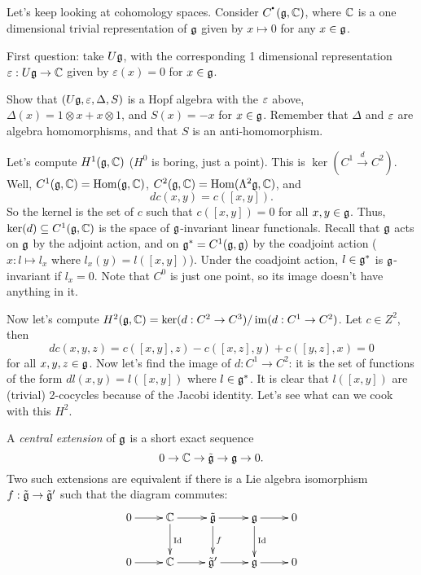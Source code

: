  Let's keep looking at cohomology spaces. Consider $C^{\udot}(\g,\CC)$, where $\mathbb{C}$ is
 a one dimensional trivial representation of $\mathfrak{g}$ given by $x\mapsto 0$ for any
 $x\in\mathfrak{g}$.

 First question: take $U\mathfrak{g}$, with the corresponding 1 dimensional representation
 $\varepsilon:U\mathfrak{g}\rightarrow\mathbb{C}$ given by $\varepsilon(x)=0$ for $x\in\mathfrak{g}$.

 \begin{exercise}
   Show that $(U\mathfrak{g},\varepsilon,\Delta,S)$ is a Hopf algebra with the $\varepsilon$ above,
   $\Delta(x)=1\otimes x+x\otimes 1$, and $S(x)=-x$  for $x\in\mathfrak{g}$. Remember that
   $\Delta$ and $\varepsilon$ are algebra homomorphisms, and that $S$ is an anti-homomorphism.
 \end{exercise}

 Let's compute $H^{1}(\mathfrak{g},\mathbb{C})$ ($H^{0}$ is boring, just a point). This is
 $\ker(C^{1}\xrightarrow{d} C^{2})$. Well, $C^{1}(\mathfrak{g},\mathbb{C})=\operatorname{Hom}(\mathfrak{g},\mathbb{C})$,
 $C^{2}(\mathfrak{g},\mathbb{C})=\operatorname{Hom} (\Lambda^{2}\mathfrak{g},\mathbb{C})$, and
 \[
 dc(x,y) = c([x,y]).
 \]
 So the kernel is the set of $c$ such that $c([x,y])=0$ for all $x,y\in\mathfrak{g}$. Thus,
 $\ker(d)\subseteq C^{1}(\mathfrak{g},\mathbb{C})$ is the space of $\mathfrak{g}$-invariant linear functionals. Recall
 that $\mathfrak{g}$ acts on $\mathfrak{g}$ by the adjoint action, and on
 $\mathfrak{g}^{*}=C^{1}(\mathfrak{g},\mathfrak{g})$ by the coadjoint action ($x:l\mapsto l_{x}$ where $l_{x}%
 (y)=l([x,y])$). Under the coadjoint action, $l\in \mathfrak{g}^*$ is $\mathfrak{g}$-invariant if
 $l_{x}=0$. Note that $C^{0}$ is just one point, so its image doesn't have anything in
 it.

 Now let's compute $H^{2}(\g,\CC)=\ker(d:C^{2}\rightarrow C^{3})/\im(d:C^{1}%
 \rightarrow C^{2})$. Let $c\in Z^{2}$, then
 \[
 dc(x,y,z)=c([x,y],z)-c([x,z],y)+c([y,z],x)=0
 \]
 for all $x,y,z\in\mathfrak{g}$. Now let's find the image of $d:C^{1}\rightarrow C^{2}$: it is
 the set of functions of the form $dl(x,y)=l([x,y])$ where $l\in\mathfrak{g}^{\ast }$. It is
 clear that $l([x,y])$ are (trivial) 2-cocycles because of the Jacobi identity. Let's
 see what can we cook with this $H^{2}$.

 \begin{definition}
 A \emph{central extension} of $\mathfrak{g}$ is a short exact sequence
 \[
 0\to \mathbb{C} \to \tilde{\mathfrak{g}}\to \mathfrak{g}\to 0.
 \]
 Two such extensions are equivalent if there is a Lie algebra isomorphism
 $f:\tilde{\mathfrak{g}}\to \tilde {\mathfrak{g}}'$ such that the diagram commutes:
 \[
 \xymatrix{
 0 \ar[r] &\CC \ar[r]\ar[d]^\id & \tilde \g \ar[r] \ar[d]^f & \g \ar[d]^\id \ar[r] & 0\\
 0 \ar[r] &\CC \ar[r] & \tilde\g' \ar[r] & \g \ar[r] & 0\\
 }
 \]
 \end{definition}

